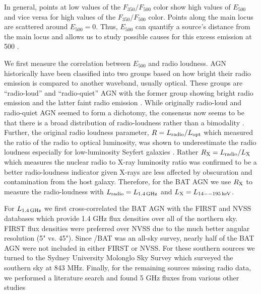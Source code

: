In general, points at low values of the $F_{350}/F_{500}$ color show high values of $E_{500}$ and vice versa for high values of the $F_{350}/F_{500}$ color. Points along the main locus are scattered around $E_{500} = 0$. Thus, $E_{500}$ can quantify a source's distance from the main locus and allows us to study possible causes for this excess emission at 500 \um.

We first measure the correlation between $E_{500}$ and radio loudness. AGN historically have been classified into two groups based on how bright their radio emission is compared to another waveband, usually optical. These groups are ``radio-loud'' and ``radio-quiet'' AGN with the former group showing bright radio emission and the latter faint radio emission \citep{Kellermann:1989sf, Xu:1999ty}. While originally radio-loud and radio-quiet AGN seemed to form a dichotomy, the consensus now seems to be that there is a broad distribution of radio-loudness rather than a bimodality \citep{Laor:2003yg, White:2000rz, Cirasuolo:2003rm, Cirasuolo:2003zl, Laor:2003yg}. Further, the original radio loudness parameter, $R = L_{\rm radio}/L_{\rm opt}$ which measured the ratio of the radio to optical luminosity, was shown to underestimate the radio loudness especially for low-luminosity Seyfert galaxies \citep{Terashima:2003fv}. Rather $R_{\rm X} = L_{\rm radio}/L_{\rm X}$ which measures the nuclear radio to X-ray luminosity ratio was confirmed to be a better radio-loudness indicator given X-rays are less affected by obscuration and contamination from the host galaxy. Therefore, for the BAT AGN we use $R_{\rm X}$ to measure the radio-loudness with $L_{\rm radio} = L_{\rm 1.4\,GHz}$ and $L_{\rm X} = L_{\rm 14--195\,keV}$. 

For $L_{\rm 1.4\,GHz}$ we first cross-correlated the BAT AGN with the FIRST and NVSS databases which provide 1.4 GHz flux densities over all of the northern sky. FIRST flux densities were preferred over NVSS due to the much better angular resolution (5" vs. 45"). Since \swift/BAT was an all-sky survey, nearly half of the BAT AGN were not included in either FIRST or NVSS. For these southern sources we turned to the Sydney University Molonglo Sky Survey \citep[SUMSS;][]{Bock:1999fp} which surveyed the southern sky at 843 MHz. Finally, for the remaining sources missing radio data, we performed a literature search and found 5 GHz fluxes from various other studies \citep{Becker:1991qd, Griffith:1993qr, Rush:1996db, Ho:2001hl, Shi:2005rc}
  